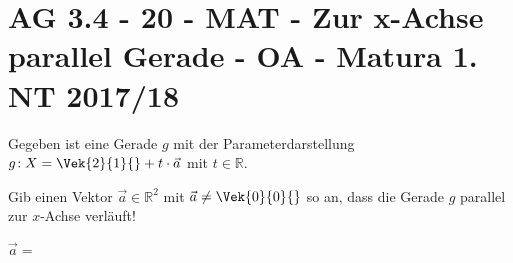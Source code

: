 \section{AG 3.4 - 20 - MAT - Zur x-Achse parallel Gerade - OA - Matura 1. NT 2017/18}

\begin{beispiel}[AG 3.4]{1}
Gegeben ist eine Gerade $g$ mit der Parameterdarstellung $g\!:X=\Vek{2}{1}{}+t\cdot\vec{a}$ mit $t\in\mathbb{R}$.

Gib einen Vektor $\vec{a}\in\mathbb{R}^2$ mit $\vec{a}\neq\Vek{0}{0}{}$ so an, dass die Gerade $g$ parallel zur $x$-Achse verläuft!

$\vec{a}=$\,
\end{beispiel}